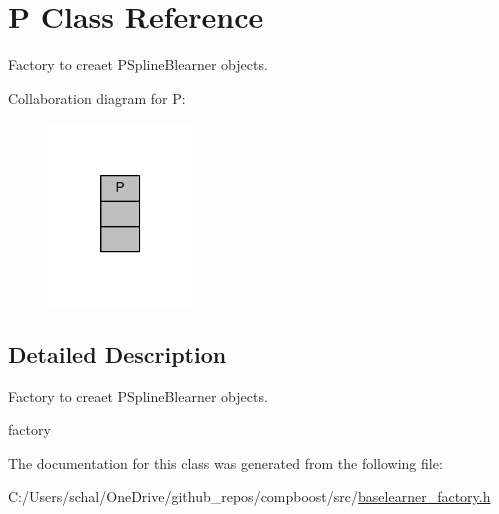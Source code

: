 \hypertarget{class_p}{}\section{P Class Reference}
\label{class_p}


Factory to creaet {\ttfamily P\+Spline\+Blearner} objects.  




Collaboration diagram for P\+:\nopagebreak
\begin{figure}[H]
\begin{center}
\leavevmode
\includegraphics[width=109pt]{class_p__coll__graph}
\end{center}
\end{figure}


\subsection{Detailed Description}
Factory to creaet {\ttfamily P\+Spline\+Blearner} objects. 

factory 

The documentation for this class was generated from the following file\+:\begin{DoxyCompactItemize}
\item 
C\+:/\+Users/schal/\+One\+Drive/github\+\_\+repos/compboost/src/\mbox{\hyperlink{baselearner__factory_8h}{baselearner\+\_\+factory.\+h}}\end{DoxyCompactItemize}
